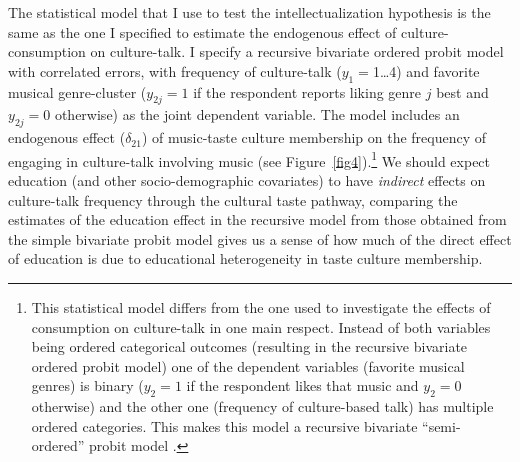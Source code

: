 \documentclass[11pt]{article}
\begin{document}
The statistical model that I use to test the intellectualization hypothesis is the same as the one I specified to estimate the endogenous effect of culture-consumption on culture-talk.  I specify a recursive bivariate ordered probit model with correlated errors, with frequency of culture-talk ($y_{1}=$1{\ldots}4) and favorite musical genre-cluster ($y_{2j}=1$ if the respondent reports liking genre $j$ best and $y_{2j}=0$  otherwise) as the joint dependent variable.  The model includes an endogenous effect ($\delta_{21}$) of music-taste culture membership on the frequency of engaging in culture-talk involving music (see Figure~\ref{fig4}).\footnote{This statistical model differs from the one used to investigate the effects of consumption on culture-talk in one main respect. Instead of both variables being ordered categorical outcomes (resulting in the recursive bivariate ordered probit model) one of the dependent variables (favorite musical genres) is binary ($y_{2}=1$ if the respondent likes that music and $y_{2}=0$ otherwise) and the other one (frequency of culture-based talk) has multiple ordered categories. This makes this model a recursive bivariate ``semi-ordered'' probit model \citep{armstrong_mcvicar02}.}  We should expect education (and other socio-demographic covariates) to have \emph{indirect} effects on culture-talk frequency through the cultural taste pathway, comparing the estimates of the education effect in the recursive model from those obtained from the simple bivariate probit model gives us a sense of how much of the direct effect of education is due to educational heterogeneity in taste culture membership.   
\end{document}
